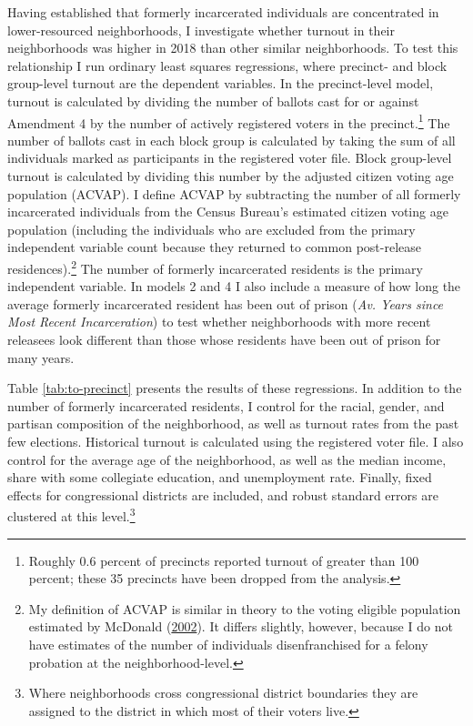 \documentclass[
  12pt,
]{article}
\begin{document}
Having established that formerly incarcerated individuals are concentrated in lower-resourced neighborhoods, I investigate whether turnout in their neighborhoods was higher in 2018 than other similar neighborhoods. To test this relationship I run ordinary least squares regressions, where precinct- and block group-level turnout are the dependent variables. In the precinct-level model, turnout is calculated by dividing the number of ballots cast for or against Amendment 4 by the number of actively registered voters in the precinct.\footnote{Roughly 0.6 percent of precincts reported turnout of greater than 100 percent; these 35 precincts have been dropped from the analysis.} The number of ballots cast in each block group is calculated by taking the sum of all individuals marked as participants in the registered voter file. Block group-level turnout is calculated by dividing this number by the adjusted citizen voting age population (ACVAP). I define ACVAP by subtracting the number of all formerly incarcerated individuals from the Census Bureau's estimated citizen voting age population (including the individuals who are excluded from the primary independent variable count because they returned to common post-release residences).\footnote{My definition of ACVAP is similar in theory to the voting eligible population estimated by McDonald (\protect\hyperlink{ref-McDonald2002}{2002}). It differs slightly, however, because I do not have estimates of the number of individuals disenfranchised for a felony probation at the neighborhood-level.} The number of formerly incarcerated residents is the primary independent variable. In models 2 and 4 I also include a measure of how long the average formerly incarcerated resident has been out of prison (\emph{Av. Years since Most Recent Incarceration}) to test whether neighborhoods with more recent releasees look different than those whose residents have been out of prison for many years.

Table \ref{tab:to-precinct} presents the results of these regressions. In addition to the number of formerly incarcerated residents, I control for the racial, gender, and partisan composition of the neighborhood, as well as turnout rates from the past few elections. Historical turnout is calculated using the registered voter file. I also control for the average age of the neighborhood, as well as the median income, share with some collegiate education, and unemployment rate. Finally, fixed effects for congressional districts are included, and robust standard errors are clustered at this level.\footnote{Where neighborhoods cross congressional district boundaries they are assigned to the district in which most of their voters live.}
\end{document}
